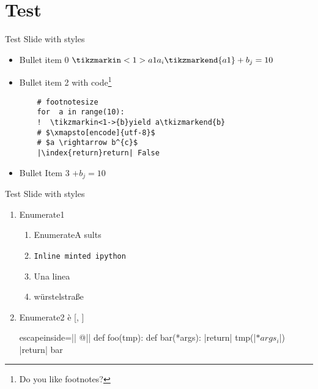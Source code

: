 
\section{Test}


\begin{frame}[fragile]{Test Slide with styles}
\begin{itemize}
\item Bullet  item 0 $\tikzmarkin<1>{a1}a_i\tikzmarkend{a1} + b_j = 10 $
\item Bullet  item 2 with code\footnote{Do you like footnotes?}
\begin{verbatim}
    # footnotesize
    for  a in range(10):
    !  \tikzmarkin<1->{b}yield a\tkizmarkend{b}
    # $\xmapsto[encode]{utf-8}$
    # $a \rightarrow b^{c}$
    |\index{return}return| False
\end{verbatim}
\item Bullet Item 3  $ + b_j = 10 $
\end{itemize}
\end{frame}

\begin{frame}[fragile]{Test Slide with styles}
\begin{enumerate}
\item Enumerate1  
    \begin{enumerate}
    \item EnumerateA  sults
    \item \texttt{Inline minted ipython}
    \item Una linea 
    \item w\"urstelstra\ss e
    \end{enumerate}

\item Enumerate2 \`{e} 
 [, ] 
\begin{pythoncode*}{escapeinside=||}
@||
def foo(tmp):
    def bar(*args):
        |return| tmp(|$*args_{i}$|)
    |return| bar
\end{pythoncode*}

\end{enumerate}

\end{frame}

